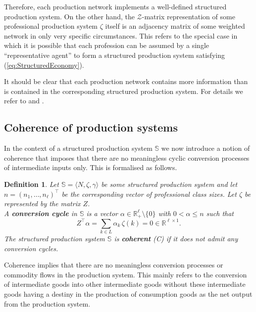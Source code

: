 \documentclass[11pt,fleqn]{article}
\newtheorem{definition}[theorem]{Definition}
\begin{document}
Therefore, each production network implements a well-defined structured production system. On the other hand, the $\mathcal Z$-matrix representation of some professional production system $\zeta$ itself is an adjacency matrix of some weighted network in only very specific circumstances. This refers to the special case in which it is possible that each profession can be assumed by a single ``representative agent'' to form a structured production system satisfying (\ref{eq:StructuredEconomy}).

It should be clear that each production network contains more information than is contained in the corresponding structured production system. For details we refer to \citet[Chapter 6]{SDL-2} and \citet{GillesPesce-SP-3}.


\subsection{Coherence of production systems}

In the context of a structured production system $\mathbb S$ we now introduce a  notion of coherence that imposes that there are no meaningless cyclic conversion processes of intermediate inputs only. This is formalised as follows. 

\begin{definition} \label{def:Coherence}
	Let $\mathbb S = \langle N, \zeta , \gamma \rangle$ be some structured production system and let $n = (n_1, \ldots , n_\ell )^\top$ be the corresponding vector of professional class sizes. Let $\zeta$ be represented by the matrix $Z$.  \\
	A \textbf{conversion cycle} in $\mathbb S$ is a  vector $\alpha \in \mathbb R^\ell_+ \setminus \{ 0 \}$ with $0 < \alpha \leqslant n$ such that
	\begin{equation}
	Z^\top \alpha = \sum_{k \in L} \alpha_k \, \zeta (k) =0 \in \mathbb{R}^{\ell \times 1}.
	\end{equation}
	The structured production system $\mathbb S$ is \textbf{coherent} (C) if it does not admit any conversion cycles.
\end{definition}

\noindent
Coherence implies that there are no meaningless conversion processes or commodity flows in the production system. This mainly refers to the conversion of intermediate goods into other intermediate goods without these intermediate goods having a destiny in the production of consumption goods as the net output from the production system. 
\end{document}
